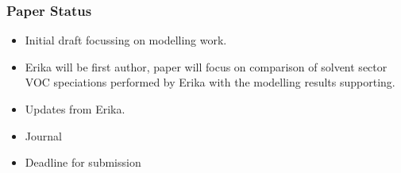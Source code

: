 {
    \begin{frame}[plain]
    \end{frame}
}

\begin{frame}
    \frametitle{Paper Status}

    \begin{itemize}
        \item Initial draft focussing on modelling work.
        \item Erika will be first author, paper will focus on comparison of solvent sector VOC speciations performed by Erika with the modelling results supporting.
        \item Updates from Erika.
        \item Journal
        \item Deadline for submission
    \end{itemize}
\end{frame}
